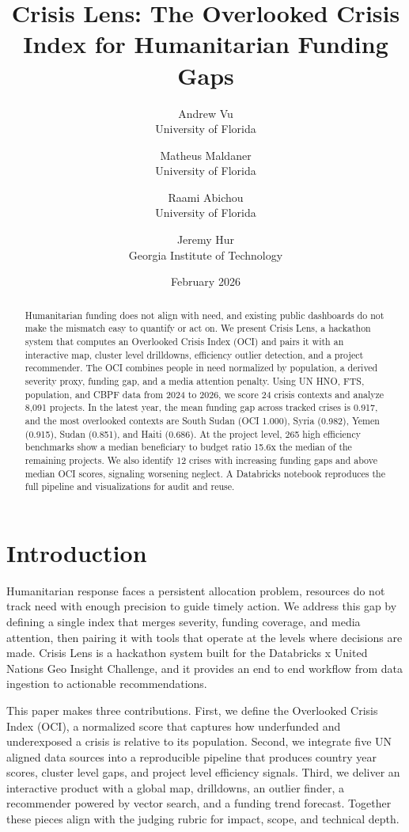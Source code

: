 \documentclass[11pt]{article}
\title{Crisis Lens: The Overlooked Crisis Index for Humanitarian Funding Gaps}
\author{
Andrew Vu \\ University of Florida
\and Matheus Maldaner \\ University of Florida
\and Raami Abichou \\ University of Florida
\and Jeremy Hur \\ Georgia Institute of Technology
}
\date{February 2026}
\begin{document}
\maketitle

\begin{abstract}
Humanitarian funding does not align with need, and existing public dashboards do not make the mismatch easy to quantify or act on. We present Crisis Lens, a hackathon system that computes an Overlooked Crisis Index (OCI) and pairs it with an interactive map, cluster level drilldowns, efficiency outlier detection, and a project recommender. The OCI combines people in need normalized by population, a derived severity proxy, funding gap, and a media attention penalty. Using UN HNO, FTS, population, and CBPF data from 2024 to 2026, we score 24 crisis contexts and analyze 8,091 projects. In the latest year, the mean funding gap across tracked crises is 0.917, and the most overlooked contexts are South Sudan (OCI 1.000), Syria (0.982), Yemen (0.915), Sudan (0.851), and Haiti (0.686). At the project level, 265 high efficiency benchmarks show a median beneficiary to budget ratio 15.6x the median of the remaining projects. We also identify 12 crises with increasing funding gaps and above median OCI scores, signaling worsening neglect. A Databricks notebook reproduces the full pipeline and visualizations for audit and reuse.
\end{abstract}

\section{Introduction}
Humanitarian response faces a persistent allocation problem, resources do not track need with enough precision to guide timely action. We address this gap by defining a single index that merges severity, funding coverage, and media attention, then pairing it with tools that operate at the levels where decisions are made. Crisis Lens is a hackathon system built for the Databricks x United Nations Geo Insight Challenge, and it provides an end to end workflow from data ingestion to actionable recommendations.

This paper makes three contributions. First, we define the Overlooked Crisis Index (OCI), a normalized score that captures how underfunded and underexposed a crisis is relative to its population. Second, we integrate five UN aligned data sources into a reproducible pipeline that produces country year scores, cluster level gaps, and project level efficiency signals. Third, we deliver an interactive product with a global map, drilldowns, an outlier finder, a recommender powered by vector search, and a funding trend forecast. Together these pieces align with the judging rubric for impact, scope, and technical depth.
\end{document}
